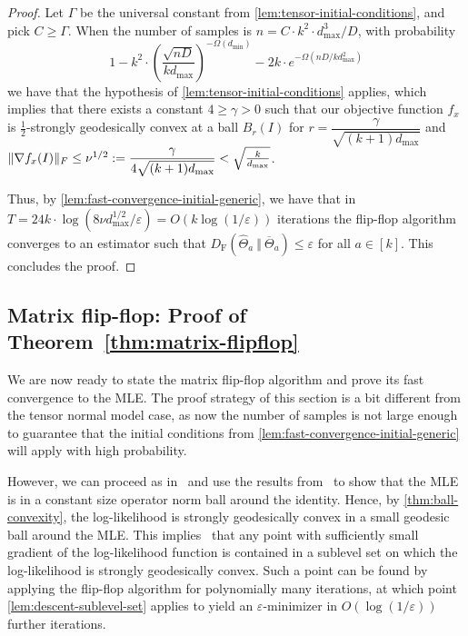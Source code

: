 \documentclass[aos]{imsart}
\theoremstyle{definition}
\numberwithin{equation}{section}
\DeclarePairedDelimiter{\norm}{\lVert}{\rVert}
\newcommand{\otheta}{\overline{\Theta}}
\newcommand{\htheta}{\widehat{\Theta}}
\newcommand{\eps}{\varepsilon}
\newcommand{\DF}{D_{\operatorname{F}}}
\def\dmin{d_{\min}}
\def\dmax{d_{\max}}
\begin{document}
\begin{proof}
	Let $\Gamma$ be the universal constant from \cref{lem:tensor-initial-conditions}, and pick $C \geq \Gamma$. When the number of samples is $n = C \cdot k^2 \cdot \dmax^3/D$, with probability
	$$ 1 - k^2 \cdot \left( \dfrac{\sqrt{nD}}{k \dmax} \right)^{-\Omega(\dmin)} - 2k \cdot e^{- \Omega(nD/k \dmax^2)}$$
	we have that the hypothesis of \cref{lem:tensor-initial-conditions} applies, which implies that there exists a constant $4 \geq \gamma > 0$ such that our objective function $f_x$ is $\frac{1}{2}$-strongly geodesically convex at a ball $B_r(I)$ for $r = \dfrac{\gamma}{\sqrt{(k+1)\dmax}}$ and $\norm{\nabla f_x(I)}_F \leq \nu^{1/2}:=\dfrac{\gamma}{4 \sqrt{(k+1)\dmax}} < \sqrt{\frac{k}{\dmax}}$.

Thus, by \cref{lem:fast-convergence-initial-generic}, we have that in $T = 24k \cdot \log(8 \nu \dmax^{1/2}/\eps) = O(k \log( 1/\eps))$ iterations the flip-flop algorithm converges to an estimator such that $\DF(\htheta_a \ \Vert  \ \otheta_a) \leq \eps$ for all $a \in [k]$. This concludes the proof.
\end{proof}

\subsection{Matrix flip-flop: Proof of Theorem~\ref{thm:matrix-flipflop}}

We are now ready to state the matrix flip-flop algorithm and prove its fast convergence to the MLE.
The proof strategy of this section is a bit different from the tensor normal model case, as now the number of samples is not large enough to guarantee that the initial conditions from \cref{lem:fast-convergence-initial-generic} will apply with high probability.

However, we can proceed as in~\cite{FM20} and use the results from~\cite{KLR19} to show that the MLE is in a constant size operator norm ball around the identity. Hence, by \cref{thm:ball-convexity}, the log-likelihood is strongly geodesically convex in a small geodesic ball around the MLE. This implies~\cite[Lemma 4.7]{FM20} that any point with sufficiently small gradient of the log-likelihood function is contained in a sublevel set on which the log-likelihood is strongly geodesically convex. Such a point can be found by applying the flip-flop algorithm for polynomially many iterations, at which point \cref{lem:descent-sublevel-set} applies to yield an $\varepsilon$-minimizer in $O(\log(1/\varepsilon))$ further iterations.
\end{document}
